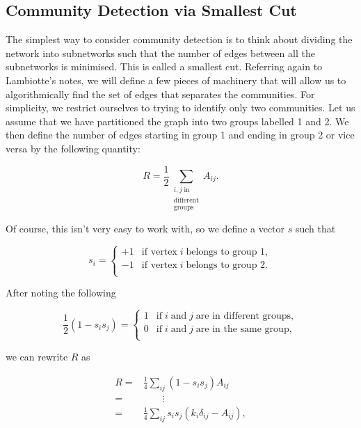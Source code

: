 
\subsection{Community Detection via Smallest Cut}\label{sec:smallest_cut}
The simplest way to consider community detection is to think about dividing the network into subnetworks such that the number of edges between all the subnetworks is minimised. This is called a smallest cut. Referring again to Lambiotte's notes, we will define a few pieces of machinery that will allow us to algorithmically find the set of edges that separates the communities\cite[26-27]{oxford:renaud_notes}. For simplicity, we restrict ourselves to trying to identify only two communities. Let us assume that we have partitioned the graph into two groups labelled 1 and 2. We then define the number of edges starting in group 1 and ending in group 2 or vice versa by the following quantity:

$$ R = \frac{1}{2} \sum_{\substack{i, j \; \text{in} \\ \text{different} \\ \text{groups}}} A_{ij}. $$

Of course, this isn't very easy to work with, so we define a vector $s$ such that

$$ s_i = 
\begin{cases}
    +1 & \text{if vertex} \; i \; \text{belongs to group 1}, \\
    -1 & \text{if vertex} \; i \; \text{belongs to group 2}. \\
\end{cases}
$$

After noting the following

$$ \frac{1}{2}(1 - s_i s_j) = 
\begin{cases}
    1 & \text{if} \; i \; \text{and} \; j \; \text{are in different groups}, \\
    0 & \text{if} \; i \; \text{and} \; j \; \text{are in the same group}, \\
\end{cases}
$$

we can rewrite $R$ as

$$
\begin{aligned}
    R =& \frac{1}{4}\sum_{ij}(1 - s_i s_j)A_{ij} \\
      =& \qquad \vdots \\
      =& \frac{1}{4}\sum_{ij}s_i s_j(k_i\delta_{ij} - A_{ij}), \\
\end{aligned}
$$

